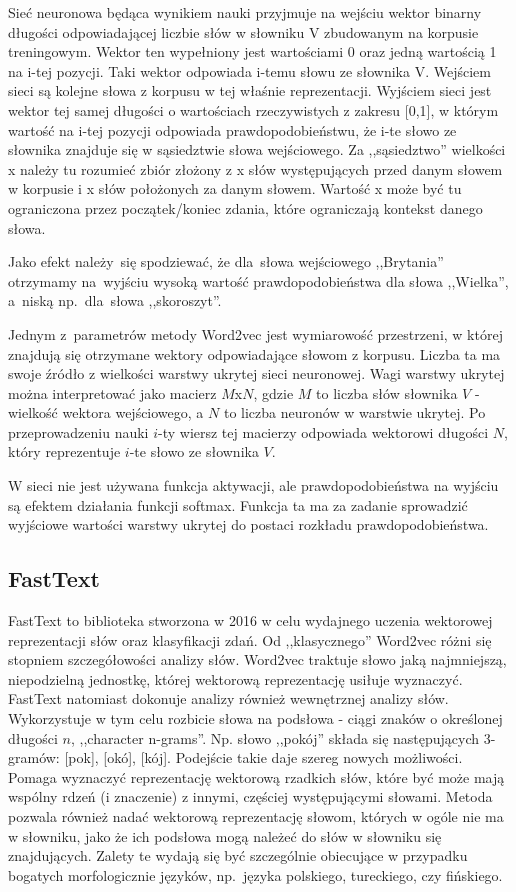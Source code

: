 \documentclass[pl]{minipw} %
\begin{document}
Sieć neuronowa będąca wynikiem nauki przyjmuje na wejściu wektor binarny długości odpowiadającej liczbie słów w słowniku V zbudowanym na korpusie treningowym. Wektor ten wypełniony jest wartościami 0 oraz jedną wartością 1 na i-tej pozycji. Taki wektor odpowiada i-temu słowu ze słownika V. Wejściem sieci są kolejne słowa z korpusu w tej właśnie reprezentacji. Wyjściem sieci jest wektor tej samej długości o wartościach rzeczywistych z zakresu [0,1], w którym wartość na i-tej pozycji odpowiada prawdopodobieństwu, że i-te słowo ze słownika znajduje się w sąsiedztwie słowa wejściowego. Za ,,sąsiedztwo'' wielkości x należy tu rozumieć zbiór złożony z x słów występujących przed danym słowem w korpusie i x słów położonych za danym słowem. Wartość x może być tu ograniczona przez początek/koniec zdania, które ograniczają kontekst danego słowa.

Jako efekt należy~się spodziewać, że dla~słowa wejściowego ,,Brytania'' otrzymamy na~wyjściu wysoką wartość prawdopodobieństwa dla słowa ,,Wielka'', a~niską np.~dla~słowa ,,skoroszyt''.

Jednym z~parametrów metody Word2vec jest wymiarowość przestrzeni, w której znajdują się otrzymane wektory odpowiadające słowom z korpusu. Liczba ta ma swoje źródło z wielkości warstwy ukrytej sieci neuronowej. Wagi warstwy ukrytej można interpretować jako macierz $M$x$N$, gdzie $M$ to liczba słów słownika $V$ - wielkość wektora wejściowego, a $N$ to liczba neuronów w warstwie ukrytej. Po przeprowadzeniu nauki $i$-ty wiersz tej macierzy odpowiada wektorowi długości $N$, który reprezentuje $i$-te słowo ze słownika $V$.

W sieci nie jest używana funkcja aktywacji, ale prawdopodobieństwa na wyjściu są efektem działania funkcji softmax. Funkcja ta ma za zadanie sprowadzić wyjściowe wartości warstwy ukrytej do postaci rozkładu prawdopodobieństwa. 


\subsection{FastText}

FastText \cite{fasttext} to biblioteka stworzona w 2016 w celu wydajnego uczenia wektorowej reprezentacji słów oraz klasyfikacji zdań. Od ,,klasycznego'' Word2vec różni się stopniem szczegółowości analizy słów. Word2vec traktuje słowo jaką najmniejszą, niepodzielną jednostkę, której wektorową reprezentację usiłuje wyznaczyć. FastText natomiast dokonuje analizy również wewnętrznej analizy słów. Wykorzystuje w tym celu rozbicie słowa na podsłowa - ciągi znaków o określonej długości $n$, ,,character n-grams''. Np. słowo ,,pokój'' składa się następujących 3-gramów: [pok], [okó], [kój]. Podejście takie daje szereg nowych możliwości. Pomaga wyznaczyć reprezentację wektorową rzadkich słów, które być może mają wspólny rdzeń (i znaczenie) z innymi, częściej występującymi słowami. Metoda pozwala również nadać wektorową reprezentację słowom, których w ogóle nie ma w słowniku, jako że ich podsłowa mogą należeć do słów w słowniku się znajdujących. Zalety te wydają się być szczególnie obiecujące w przypadku bogatych morfologicznie języków, np.~języka polskiego, tureckiego, czy fińskiego.
\end{document}
